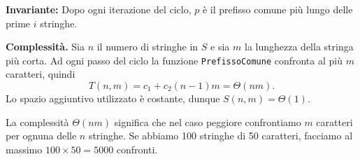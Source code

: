 \noindent\textbf{Invariante:} Dopo ogni iterazione del ciclo, $p$ è il prefisso comune più lungo delle prime $i$ stringhe.

\textbf{Complessità.}
Sia $n$ il numero di stringhe in $S$ e sia $m$ la lunghezza della
stringa più corta. Ad ogni passo del ciclo la funzione
\texttt{PrefissoComune} confronta al più $m$ caratteri, quindi
\[
T(n,m) = c_1 + c_2 (n-1)m = \Theta(nm).
\]
Lo spazio aggiuntivo utilizzato è costante, dunque $S(n,m) = \Theta(1)$.

\begin{nota}
	La complessità $\Theta(nm)$ significa che nel caso peggiore confrontiamo $m$ caratteri per ognuna delle $n$ stringhe. Se abbiamo 100 stringhe di 50 caratteri, facciamo al massimo $100 \times 50 = 5000$ confronti.
\end{nota}

\pagebreak
